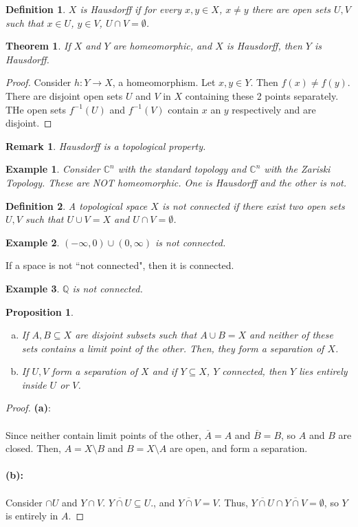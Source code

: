\documentclass{article}
\newcommand{\C}{\mathbb{C}}
\newcommand{\Q}{\mathbb{Q}}
\newtheorem{theorem}{Theorem}
\newtheorem{example}{Example}
\newtheorem{remark}{Remark}
\newtheorem{proposition}{Proposition}
\newtheorem{definition}{Definition}
\begin{document}
 \begin{definition}
 $X$ is Hausdorff if for every $x,y\in X$, $x\neq y$ there are open sets $U,V$ such that $x\in U$, $y\in V$, $U\cap V=\emptyset$.
 \end{definition}
 \begin{theorem}
 If $X$ and $Y$ are homeomorphic, and $X$ is Hausdorff, then $Y$ is Hausdorff.
 \end{theorem}
 \begin{proof}
 Consider $h:Y\rightarrow X$, a homeomorphism. Let $x,y\in Y$. Then $f(x)\neq f(y)$. There are disjoint open sets $U$ and $V$ in $X$ containing these 2 points separately. THe open sets $f^{-1}(U)$ and $f^{-1}(V)$ contain $x$ an $y$ respectively and are disjoint.
 \end{proof}
 \begin{remark}
 Hausdorff is a topological property.
 \end{remark}
 \begin{example}
 Consider $\C^n$ with the standard topology and $\C^n$ with the Zariski Topology. These are NOT homeomorphic. One is Hausdorff and the other is not.
 \end{example}
 \begin{definition}
 A topological space $X$ is not connected if there exist two open sets $U,V$ such that $U\cup V = X$ and $U\cap V=\emptyset$.
 \end{definition}
 \begin{example}
 $(-\infty,0)\cup (0,\infty)$ is not connected.
 \end{example}
 \noindent If a space is not ``not connected", then it is connected.
 \begin{example}
 $\Q$ is not connected.
 \end{example}
 \begin{proposition}
 \begin{enumerate}[(a)]
 \item
 If $A,B\subseteq X$ are disjoint subsets such that $A\cup B=X$ and neither of these sets contains a limit point of the other. Then, they form a separation of $X$. 
\item If $U,V$ form a separation of $X$ and if $Y\subseteq X$, $Y$ connected, then $Y$ lies entirely inside $U$ or $V$.
 \end{enumerate}
 \end{proposition}
 \begin{proof}
 \textbf{(a)}:\\
 \\
 Since neither contain limit points of the other, $\overline{A}=A$ and $\overline{B}=B$, so $A$ and $B$ are closed. Then, $A=X\setminus B$ and $B=X\setminus A$ are open, and form a separation.\\
 \\
 \textbf{(b):}\\
 \\
 Consider $\cap U$ and $Y\cap V$. $\overline{Y\cap U}\subseteq U$., and $\overline{Y\cap V}=V$. Thus, $\overline{Y\cap U}\cap \overline{Y\cap V}=\emptyset$, so $Y$ is entirely in $A$. 
 \end{proof}
\end{document}
